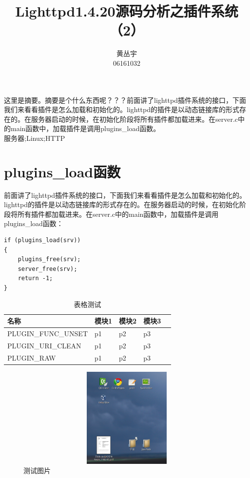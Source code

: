 \documentclass[12pt, dvipdfm]{book}
\begin{document}
\title{Lighttpd1.4.20源码分析之插件系统（2）}
\author{黄丛宇\\06161032}
\maketitle

\tableofcontents

\newpage
\newpage
\zhabstract 
这里是摘要。摘要是个什么东西呢？？？前面讲了lighttpd插件系统的接口，下面我们来看看插件是怎么加载和初始化的。lighttpd的插件是以动态链接库的形式存在的。在服务器启动的时候，在初始化阶段将所有插件都加载进来。在server.c中的main函数中，加载插件是调用plugins\_load函数。\\

{\zhkeywords 服务器;Linux;HTTP}

\chapter{plugins\_load函数}
前面讲了lighttpd插件系统的接口，下面我们来看看插件是怎么加载和初始化的。lighttpd的插件是以动态链接库的形式存在的。在服务器启动的时候，在初始化阶段将所有插件都加载进来。在server.c中的main函数中，加载插件是调用plugins\_load函数：

\begin{verbatim}
if (plugins_load(srv))
{
	plugins_free(srv);
	server_free(srv);
	return -1;
}
\end{verbatim}


\begin{table}[htbp]
\caption{表格测试}
\centering
\begin{tabularx}{\textwidth}{XXXXl} %
\toprule
\centering 名称 & \centering  模块1 & \centering  模块2 &\centering 模块3&\\
\midrule
\centering PLUGIN\_FUNC\_UNSET &\centering  p1 &\centering  p2 &\centering  p3&\\
\centering PLUGIN\_URI\_CLEAN &\centering  p1 &\centering  p2 &\centering  p3&\\
\centering PLUGIN\_RAW &\centering  p1 &\centering  p2 &\centering  p3&\\
\bottomrule
\end{tabularx}
\end{table}

\begin{figure}[htbp]
\centering
\caption{测试图片}
\includegraphics[height=5cm, width=16cm]{test.eps}
\end{figure}
\end{document}

